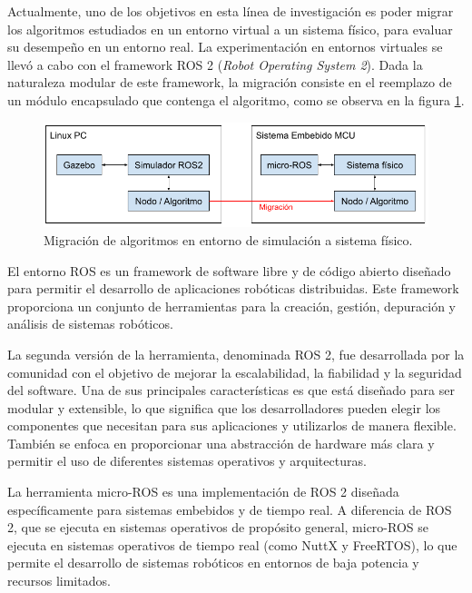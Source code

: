 \documentclass[
11pt, %
codirector, %
]{charter}
\begin{document}
Actualmente, uno de los objetivos en esta línea de investigación es poder migrar los algoritmos estudiados en un entorno virtual a un sistema físico, para evaluar su desempeño en un entorno real. La experimentación en entornos virtuales se llevó a cabo con el framework ROS 2 (\textit{Robot Operating System 2}).
Dada la naturaleza modular de este framework, la migración consiste en el reemplazo de un módulo encapsulado que contenga el algoritmo, como se observa en la figura \ref{fig:ros2-to-microros}.

\begin{figure}[htpb]
\centering
\includegraphics[width=.8\textwidth]{./Figuras/ros2-microros-migration.png}
\caption{Migración de algoritmos en entorno de simulación a sistema físico.}
\label{fig:ros2-to-microros}
\end{figure}


El entorno ROS es un framework de software libre y de código abierto diseñado para permitir el desarrollo de aplicaciones robóticas distribuidas. Este framework proporciona un conjunto de herramientas para la creación, gestión, depuración y análisis de sistemas robóticos.

La segunda versión de la herramienta, denominada ROS 2, fue desarrollada por la comunidad con el objetivo de mejorar la escalabilidad, la fiabilidad y la seguridad del software.
Una de sus principales características es que está diseñado para ser modular y extensible, lo que significa que los desarrolladores pueden elegir los componentes que necesitan para sus aplicaciones y utilizarlos de manera flexible.
También se enfoca en proporcionar una abstracción de hardware más clara y permitir el uso de diferentes sistemas operativos y arquitecturas.

La herramienta micro-ROS es una implementación de ROS 2 diseñada específicamente para sistemas embebidos y de tiempo real. A diferencia de ROS 2, que se ejecuta en sistemas operativos de propósito general, micro-ROS se ejecuta en sistemas operativos de tiempo real (como NuttX y FreeRTOS), lo que permite el desarrollo de sistemas robóticos en entornos de baja potencia y recursos limitados.
\end{document}
